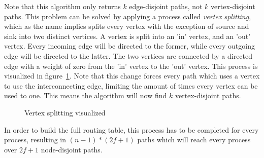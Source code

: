 Note that this algorithm only returns $k$ edge-disjoint paths, not $k$ vertex-disjoint paths. This problem can be solved by applying a process called \textit{vertex splitting}, which as the name implies splits every vertex with the exception of source and sink into two distinct vertices. 
A vertex is split into an 'in' vertex, and an 'out' vertex. Every incoming edge will be directed to the former, while every outgoing edge will be directed to the latter. The two vertices are connected by a directed edge with a weight of zero from the 'in' vertex to the 'out' vertex. This process is visualized in figure~\ref{contr:node-splitting}. Note that this change forces every path which uses a vertex to use the interconnecting edge, limiting the amount of times every vertex can be used to one. This means the algorithm will now find $k$ vertex-disjoint paths.

\begin{figure}[h]
    \centering
    \caption{Vertex splitting visualized}
    \label{contr:node-splitting}
\end{figure}

In order to build the full routing table, this process has to be completed for every process, resulting in $(n-1) * (2f+1)$ paths which will reach every process over $2f+1$ node-disjoint paths.

